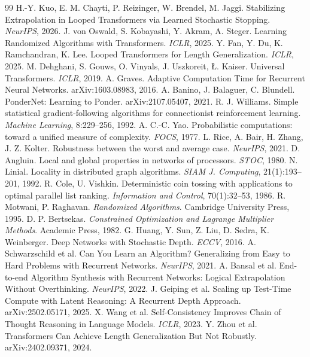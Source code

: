 \documentclass[10pt]{article}
\theoremstyle{definition}
\theoremstyle{remark}
\begin{document}

\clearpage
\begin{thebibliography}{99}\small
{} H.-Y. Kuo, E. M. Chayti, P. Reizinger, W. Brendel, M. Jaggi. Stabilizing Extrapolation in Looped Transformers via Learned Stochastic Stopping. \emph{NeurIPS}, 2026.
 J. von Oswald, S. Kobayashi, Y. Akram, A. Steger. Learning Randomized Algorithms with Transformers. \emph{ICLR}, 2025.
 Y. Fan, Y. Du, K. Ramchandran, K. Lee. Looped Transformers for Length Generalization. \emph{ICLR}, 2025.
 M. Dehghani, S. Gouws, O. Vinyals, J. Uszkoreit, \L{}. Kaiser. Universal Transformers. \emph{ICLR}, 2019.
 A. Graves. Adaptive Computation Time for Recurrent Neural Networks. arXiv:1603.08983, 2016.
 A. Banino, J. Balaguer, C. Blundell. PonderNet: Learning to Ponder. arXiv:2107.05407, 2021.
 R. J. Williams. Simple statistical gradient-following algorithms for connectionist reinforcement learning. \emph{Machine Learning}, 8:229--256, 1992.
 A. C.-C. Yao. Probabilistic computations: toward a unified measure of complexity. \emph{FOCS}, 1977.
 L. Rice, A. Bair, H. Zhang, J. Z. Kolter. Robustness between the worst and average case. \emph{NeurIPS}, 2021.
 D. Angluin. Local and global properties in networks of processors. \emph{STOC}, 1980.
 N. Linial. Locality in distributed graph algorithms. \emph{SIAM J. Computing}, 21(1):193--201, 1992.
 R. Cole, U. Vishkin. Deterministic coin tossing with applications to optimal parallel list ranking. \emph{Information and Control}, 70(1):32--53, 1986.
 R. Motwani, P. Raghavan. \emph{Randomized Algorithms}. Cambridge University Press, 1995.
 D. P. Bertsekas. \emph{Constrained Optimization and Lagrange Multiplier Methods}. Academic Press, 1982.
 G. Huang, Y. Sun, Z. Liu, D. Sedra, K. Weinberger. Deep Networks with Stochastic Depth. \emph{ECCV}, 2016.
 A. Schwarzschild et al. Can You Learn an Algorithm? Generalizing from Easy to Hard Problems with Recurrent Networks. \emph{NeurIPS}, 2021.
 A. Bansal et al. End-to-end Algorithm Synthesis with Recurrent Networks: Logical Extrapolation Without Overthinking. \emph{NeurIPS}, 2022.
 J. Geiping et al. Scaling up Test-Time Compute with Latent Reasoning: A Recurrent Depth Approach. arXiv:2502.05171, 2025.
 X. Wang et al. Self-Consistency Improves Chain of Thought Reasoning in Language Models. \emph{ICLR}, 2023.
 Y. Zhou et al. Transformers Can Achieve Length Generalization But Not Robustly. arXiv:2402.09371, 2024.
\end{thebibliography}

\end{document}

